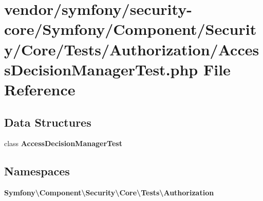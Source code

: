 \section{vendor/symfony/security-\/core/\+Symfony/\+Component/\+Security/\+Core/\+Tests/\+Authorization/\+Access\+Decision\+Manager\+Test.php File Reference}
\label{_access_decision_manager_test_8php}
\subsection*{Data Structures}
\begin{DoxyCompactItemize}
\item 
class {\bf Access\+Decision\+Manager\+Test}
\end{DoxyCompactItemize}
\subsection*{Namespaces}
\begin{DoxyCompactItemize}
\item 
 {\bf Symfony\textbackslash{}\+Component\textbackslash{}\+Security\textbackslash{}\+Core\textbackslash{}\+Tests\textbackslash{}\+Authorization}
\end{DoxyCompactItemize}

